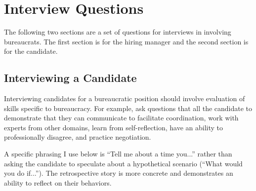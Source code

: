 \chapter{Interview Questions}

The following two sections are a set of questions for interviews in involving bureaucrats. The first section is for the hiring manager and the second section is for the candidate.


\section{Interviewing a Candidate}

Interviewing candidates for a bureaucratic position should involve evaluation of skills specific to bureaucracy. For example, ask questions that all the candidate to demonstrate that they can communicate to facilitate coordination, work with experts from other domains, learn from self-reflection, have an ability to professionally disagree, and practice negotiation. 

A specific phrasing I use below is ``Tell me about a time you...'' rather than asking the candidate to speculate about a hypothetical scenario (``What would you do if...''). The retrospective story is more concrete and demonstrates an ability to reflect on their behaviors.


